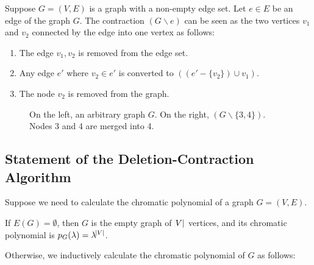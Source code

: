 \documentclass[12pt]{exam}
\begin{document}
Suppose $G = (V, E)$ is a graph with a non-empty edge set. Let $e \in E$ be  an edge of the graph $G$. The contraction $(G \backslash e)$ can be seen as  the two vertices $v_1$ and $v_2$ connected by the edge into one vertex as follows:

\begin{enumerate}
    \item The edge ${v_1, v_2}$ is removed from the edge set.
    \item Any edge $e'$ where $v_2 \in e'$ is converted to $((e' - \{v_2\}) \cup v_1)$.
    \item The node $v_2$ is removed from the graph.
\end{enumerate}

\begin{figure}[h]

    \centering
    

    \caption{On the left, an arbitrary graph $G$. On the right, $(G \backslash \{3,4\})$. Nodes 3 and 4 are merged into 4.}
    
\end{figure}

\subsection*{Statement of the Deletion-Contraction Algorithm}

Suppose we need to calculate the chromatic polynomial of a graph $G = (V, E)$. 

If $E(G) = \emptyset$, then $G$ is the empty graph of $\abs{V}$ vertices, and its chromatic polynomial is $p_G(\lambda) = \lambda^{\abs{V}}$. 

Otherwise, we inductively calculate the chromatic polynomial of $G$ as follows:
\end{document}
